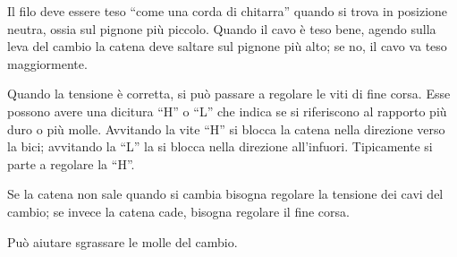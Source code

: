 Il filo deve essere teso ``come una corda di chitarra'' quando si trova in posizione neutra, ossia sul pignone più piccolo.
Quando il cavo è teso bene, agendo sulla leva del cambio la catena deve saltare sul pignone più alto; se no, il cavo va teso maggiormente.

Quando la tensione è corretta, si può passare a regolare le viti di fine corsa.
Esse possono avere una dicitura ``H'' o ``L'' che indica se si riferiscono al rapporto più duro o più molle.
Avvitando la vite ``H'' si blocca la catena nella direzione verso la bici; avvitando la ``L'' la si blocca nella direzione all'infuori.
Tipicamente si parte a regolare la ``H''.

Se la catena non sale quando si cambia bisogna regolare la tensione dei cavi del cambio; se invece la catena cade, bisogna regolare il fine corsa.

Può aiutare sgrassare le molle del cambio.
